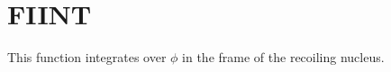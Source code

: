 \section{FIINT}
\label{sect:fiint}

\noindent This function integrates over $\phi$ in the frame of the recoiling
nucleus.\\
